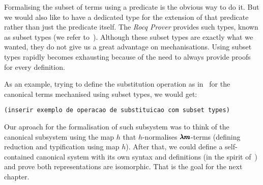 Formalising the subset of terms using a predicate is the obvious way to do it.
But we would also like to have a dedicated type for the extension of that predicate rather than just the predicate itself.
The \textit{Rocq Prover} provides such types, known as subset types (we refer to~\cite[Chapter~9.1]{CoqArt}).
Although these subset types are exactly what we wanted, they do not give us a great advantage on mechanisations.
Using subset types rapidly becomes exhausting because of the need to always provide proofs for every definition.

As an example, trying to define the substitution operation as in~\cite[Chapter~3.1]{JCES2002} for the canonical terms mechanised using subset types, we would get:
\begin{lstlisting}[language=Coq]
  (inserir exemplo de operacao de substituicao com subset types)
\end{lstlisting}

Our aproach for the formalisation of such subsystem was to think of the canonical subsystem using the map $h$ that $h$-normalises $\pmb{\lambda m}$-terms (defining reduction and typification using map $h$).
After that, we could define a self-contained canonical system with its own syntax and definitions (in the spirit of~\cite[Chapter~3.1]{JCES2002}) and prove both representations are isomorphic.
That is the goal for the next chapter.

